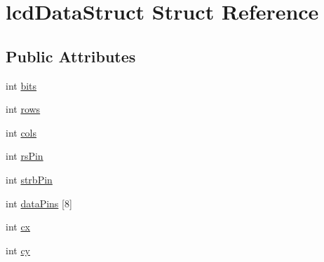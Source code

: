 \hypertarget{structlcdDataStruct}{\section{lcd\-Data\-Struct Struct Reference}
\label{structlcdDataStruct}
}
\subsection*{Public Attributes}
\begin{DoxyCompactItemize}
\item 
int \hyperlink{structlcdDataStruct_aa3cd6661697d7f9d75732c819ee773bb}{bits}
\item 
int \hyperlink{structlcdDataStruct_a204af6f15bf0744d00dd5009abf68f92}{rows}
\item 
int \hyperlink{structlcdDataStruct_a986c0457ecdfb118a9f39c006c818f3a}{cols}
\item 
int \hyperlink{structlcdDataStruct_a7445e6beca769bef1b6f7bf1ce3e1894}{rs\-Pin}
\item 
int \hyperlink{structlcdDataStruct_aec4a4388a2618850fa15603000a4a186}{strb\-Pin}
\item 
int \hyperlink{structlcdDataStruct_a7e2343472b0b4d6449fef5adbeecad08}{data\-Pins} \mbox{[}8\mbox{]}
\item 
int \hyperlink{structlcdDataStruct_a00ba0d615907c96f0bd148c5779d392f}{cx}
\item 
int \hyperlink{structlcdDataStruct_a2c6cca066a0a437b01ec898c5e27be04}{cy}
\end{DoxyCompactItemize}


